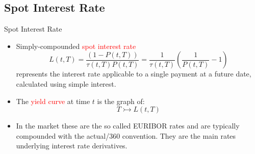 \documentclass{beamer}
\begin{document}

\subsection{Spot Interest Rate}
\begin{frame}{Spot Interest Rate}
	\begin{itemize}
		\item Simply-compounded \textcolor{red}{spot interest rate}
		\begin{equation}
			L(t,T)=\frac{(1-P(t,T))}{\tau(t,T)P(t,T)} = \frac{1}{\tau(t,T)}\left(\frac{1}{P(t,T)} - 1\right) 
		\end{equation}
		represents the interest rate applicable to a single payment at a future date, calculated using simple interest.
		\item The \textcolor{red}{yield curve} at time $t$ is the graph of:
		\begin{equation*}
			T\rightarrowtail L(t, T)
		\end{equation*}
		\item In the market these are the so called EURIBOR rates and are typically compounded with the actual/360 convention. They are the main rates underlying interest rate derivatives.
	\end{itemize}
\end{frame}
\end{document}
